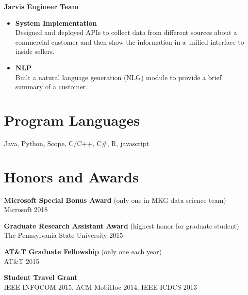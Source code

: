 \documentclass[margin,line]{res}
\begin{document}
\begin{resume}
\begin{itemize}
\end{itemize}

{\bf Jarvis Engineer Team}   \\
\begin{itemize}
  \item {\bf System Implementation}\\
   Designed and deployed APIs to collect data from different sources about a commercial customer and then show the information in a unified interface to inside sellers.
  \item {\bf NLP}\\
   Built a natural language generation (NLG) module to provide a brief summary of a customer.
\end{itemize}


\section{\sc Program Languages}
Java, Python, Scope, C/C++, C\#, R, javascript\\



\section{\sc Honors and Awards}
{\bf Microsoft Special Bonus Award} (only one in MKG data science team) \\
Microsoft \hfill 2018
\vspace{-0.1in}

{\bf Graduate Research Assistant Award} (highest honor for graduate student)\\
The Pennsylvania State University \hfill {2015}
\vspace{-0.1in}

{\bf AT\&T Graduate Fellowship} (only one each year)\\
AT\&T \hfill {2015}
\vspace{-0.1in}

{\bf Student Travel Grant}\\
IEEE INFOCOM 2015, ACM MobiHoc 2014, IEEE ICDCS 2013
\vspace{-0.1in}


\end{resume}
\end{document}
